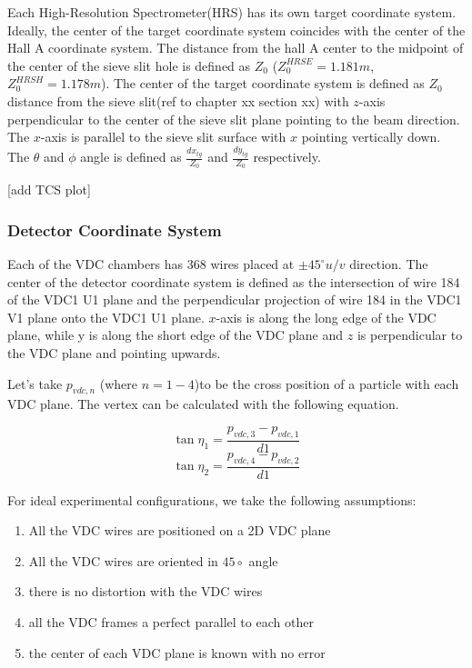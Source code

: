 Each High-Resolution Spectrometer(HRS) has its own target coordinate system. Ideally, the center of the target coordinate system coincides with the center of the Hall A coordinate system. The distance from the hall A center to the midpoint of the center of the sieve slit hole is defined as $Z_0$ ($Z^{HRSE}_0 = 1.181 m$, $Z^{HRSH}_0 = 1.178 m$). The center of the target coordinate system is defined as $Z_0$ distance from the sieve slit(ref to chapter xx section xx) with $z$-axis perpendicular to the center of the sieve slit plane pointing to the beam direction. The $x$-axis is parallel to the sieve slit surface with $x$ pointing vertically down. The $\theta$ and $\phi$ angle is defined as $\frac{dx_{tg}}{Z_0}$ and $\frac{dy_{tg}}{Z_0}$ respectively.

[add TCS plot]


\subsubsection{Detector Coordinate System}

Each of the VDC chambers has 368 wires placed at $\pm 45 ^{\circ} u/v$ direction. The center of the detector coordinate system is defined as the intersection of wire 184 of the VDC1 U1 plane and the perpendicular projection of wire 184 in the VDC1 V1 plane onto the VDC1 U1 plane. $x$-axis is along the long edge of the VDC plane, while y is along the short edge of the VDC plane and $z$ is perpendicular to the VDC plane and pointing upwards. 

Let's take $p_{vdc,n}$ (where ${n=1-4}$)to be the cross position of a particle with each VDC plane. The vertex can be calculated with the following equation. 

\begin{equation}
    \tan \eta_{1} = \frac{p_{vdc,3} - p_{vdc, 1}}{d1}    
\end{equation}
\begin{equation}
    \tan \eta_{2} = \frac{p_{vdc,4} - p_{vdc, 2}}{d1}    
\end{equation}

For ideal experimental configurations, we take the following assumptions:
\begin{enumerate}
    \item All the VDC wires are positioned on a 2D VDC plane
    \item All the VDC wires are oriented in $45\circ$ angle
    \item there is no distortion with the VDC wires
    \item all the VDC frames a perfect parallel to each other 
    \item the center of each VDC plane is known with no error
\end{enumerate}

